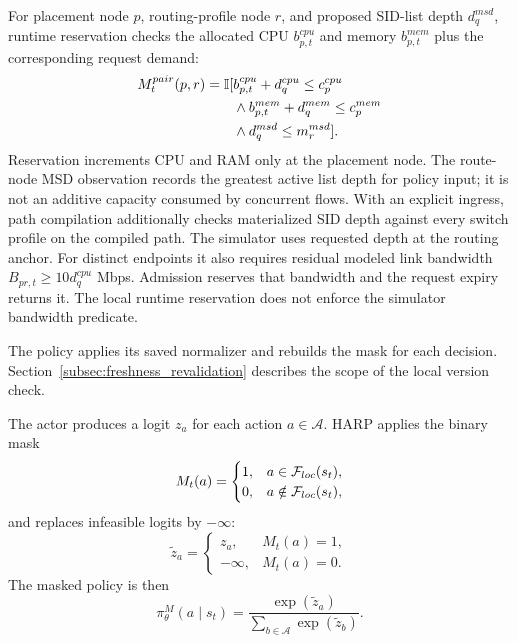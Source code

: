 \documentclass[final,5p]{elsarticle}
\newcommand{\rev}[1]{\textcolor{revisiongreen}{#1}}
\let\newrev\rev
\begin{document}
\newrev{For placement node \(p\), routing-profile node \(r\), and proposed SID-list depth \(d_q^{msd}\), runtime reservation checks the allocated CPU \(b^{cpu}_{p,t}\) and memory \(b^{mem}_{p,t}\) plus the corresponding request demand:}
\begin{equation}
\color{revisiongreen}
\begin{aligned}
M^{pair}_t(p,r)=\mathbb I[&b^{cpu}_{p,t}+d_q^{cpu}\le c_p^{cpu}\\
&\land b^{mem}_{p,t}+d_q^{mem}\le c_p^{mem}\\
&\land d_q^{msd}\le m_r^{msd}].
\end{aligned}
\label{eq:runtime_pair_mask}
\end{equation}
\newrev{Reservation increments CPU and RAM only at the placement node. The route-node MSD observation records the greatest active list depth for policy input; it is not an additive capacity consumed by concurrent flows. With an explicit ingress, path compilation additionally checks materialized SID depth against every switch profile on the compiled path. The simulator uses requested depth at the routing anchor. For distinct endpoints it also requires residual modeled link bandwidth \(B_{pr,t}\ge 10d_q^{cpu}\) Mbps. Admission reserves that bandwidth and the request expiry returns it. The local runtime reservation does not enforce the simulator bandwidth predicate.}

\newrev{The policy applies its saved normalizer and rebuilds the mask for each decision. Section~\ref{subsec:freshness_revalidation} describes the scope of the local version check.}

The actor produces a logit \(z_a\) for each action \(a\in\mathcal{A}\). HARP applies the binary mask
\begin{equation}
M_t(a)=
\begin{cases}
1, & \rev{a\in\mathcal{F}_{loc}(s_t)},\\
0, & \rev{a\notin\mathcal{F}_{loc}(s_t)},
\end{cases}
\end{equation}
and replaces infeasible logits by \(-\infty\):
\begin{equation}
\tilde{z}_a=
\begin{cases}
z_a, & M_t(a)=1,\\
-\infty, & M_t(a)=0.
\end{cases}
\end{equation}
The masked policy is then
\begin{equation}
\pi_\theta^{M}(a\mid s_t)=\frac{\exp(\tilde{z}_a)}{\sum_{b\in\mathcal{A}}\exp(\tilde{z}_b)}.
\end{equation}
\end{document}
